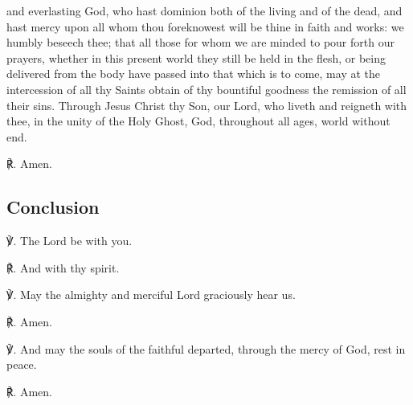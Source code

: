  and everlasting God, who hast dominion both of the living and of the dead, and hast mercy upon all whom thou foreknowest will be thine in faith and works: we humbly beseech thee; that all those for whom we are minded to pour forth our prayers, whether in this present world they still be held in the flesh, or being delivered from the body have passed into that which is to come, may at the intercession of all thy Saints obtain of thy bountiful goodness the remission of all their sins. Through Jesus Christ thy Son, our Lord, who liveth and reigneth with thee, in the unity of the Holy Ghost, God, throughout all ages, world without end.

℟. Amen.

\subsection{Conclusion}
℣. The Lord be with you.

℟. And with thy spirit.

℣. May the almighty and merciful Lord graciously hear us.

℟. Amen.

℣. And may the souls {} of the faithful departed, through the mercy of God, rest in peace.\par
℟. Amen.
